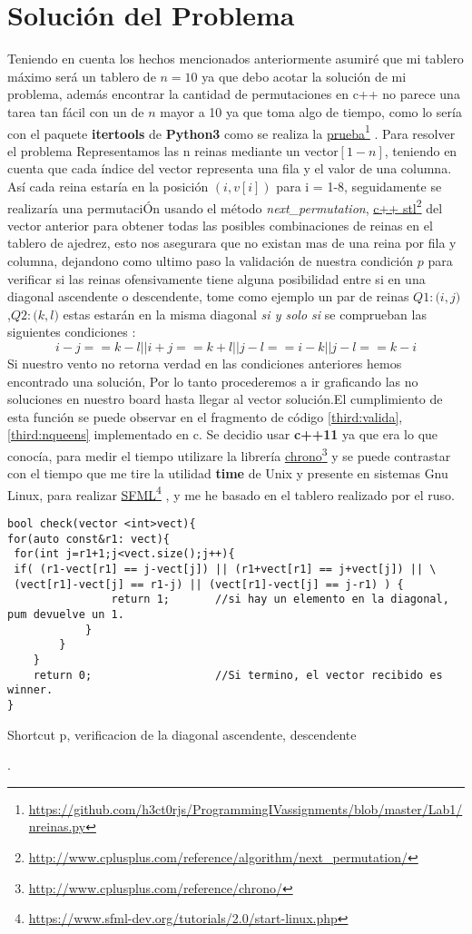 \documentclass[paper=a4, fontsize=12pt]{article} 		%
\newcommand\fnurl[2]{%
\href{#2}{#1}\footnote{\url{#2}}%
}
\numberwithin{equation}{section}						%
\numberwithin{table}{section} 							%
\begin{document}
\section{Solución del Problema}
Teniendo en cuenta los hechos mencionados anteriormente asumiré que mi tablero máximo será un tablero de $n=10$ ya que debo acotar la solución de mi problema, además encontrar la cantidad de permutaciones en c++ no parece una tarea tan fácil con un de $n$ mayor a 10 ya que toma algo de tiempo, como lo sería con el paquete \textbf{itertools} de \textbf{Python3} como se realiza la \fnurl{prueba}{https://github.com/h3ct0rjs/ProgrammingIVassignments/blob/master/Lab1/nreinas.py} . 
Para resolver el problema Representamos las n reinas mediante un vector$[1-n]$, teniendo en cuenta que cada índice del vector representa una fila y el valor de una columna. Así cada reina estaría en la posición $(i, v[i])$ para i = 1-8, seguidamente se realizaría una permutaciÓn usando el método \textit{next\_permutation}, \fnurl{c++ stl}{http://www.cplusplus.com/reference/algorithm/next_permutation/} del vector anterior para obtener todas las posibles combinaciones de reinas en el tablero de ajedrez, esto nos asegurara que no existan  mas de una reina por fila y columna, dejandono como ultimo paso la  validación de nuestra condición $p$ para verificar si las reinas ofensivamente tiene alguna posibilidad entre si en una diagonal ascendente o descendente, tome como ejemplo un par de reinas $Q1:\big(i,j\big)$ ,$Q2:\big(k,l\big)$ estas estarán en la misma diagonal \textit{si y solo si} se comprueban las siguientes condiciones :
	 	$$i-j == k-l || i+j == k+l || j-l == i-k|| j-l == k-i$$
Si nuestro vento no retorna verdad en las condiciones anteriores hemos encontrado una solución, Por lo tanto procederemos a ir graficando las no soluciones en nuestro board hasta llegar al vector solución.El cumplimiento de esta función se puede observar en el fragmento de código \ref{third:valida},\ref{third:nqueens} implementado en c\+\+.
Se decidio usar \textbf{c++11} ya que era lo que conocía, para medir el tiempo utilizare la librería \fnurl{chrono}{http://www.cplusplus.com/reference/chrono/} y se puede contrastar con el tiempo que me tire la utilidad \textbf{time} de Unix y presente en sistemas Gnu \/Linux, para realizar \fnurl{SFML}{https://www.sfml-dev.org/tutorials/2.0/start-linux.php}, y me he basado en el tablero realizado por el ruso.

\begin{listing}[H]
	\begin{verbatim}  
bool check(vector <int>vect){
for(auto const&r1: vect){
 for(int j=r1+1;j<vect.size();j++){
 if( (r1-vect[r1] == j-vect[j]) || (r1+vect[r1] == j+vect[j]) || \
 (vect[r1]-vect[j] == r1-j) || (vect[r1]-vect[j] == j-r1) ) {
				return 1;		//si hay un elemento en la diagonal, pum devuelve un 1. 
			}			
		}
	}
	return 0;					//Si termino, el vector recibido es winner.
}
\end{verbatim}
\caption{Shortcut p, verificacion de la diagonal ascendente, descendente}.
    \label{third:valida}
\end{listing}
\end{document}
